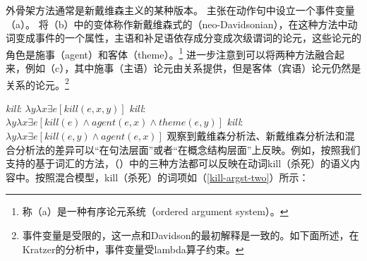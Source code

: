 外骨架方法通常是新戴维森主义的某种版本。 \citet{Davidson67a-u}主张在动作句中设立一个事件变量（a）。 \citet{Dowty89b-u}将（b）中的变体称作新戴维森式的（neo-Davidsonian），在这种方法中动词变成事件的一个属性，主语和补足语依存成分变成次级谓词的论元，这些论元的角色是施事（agent）和客体（theme）。\footnote{%
 \citet{Dowty89b-u}称（a）是一种有序论元系统（ordered argument system）。
}  \citet{Kratzer96a}进一步注意到可以将两种方法融合起来，例如（c），其中施事（主语）论元由关系提供，但是客体（宾语）论元仍然是关系的论元。\footnote{%
事件变量是受限的，这一点和Davidson的最初解释是一致的。如下面所述，在Kratzer的分析中，事件变量受lambda算子约束。} 

\eal\settowidth{} \label{neokill1}
\ex \emph{kill}: $\lambda y\lambda x\exists e[kill(e, x, y)]$  
\ex \emph{kill}: $\lambda y\lambda x\exists e[kill(e) \wedge agent(e, x) \wedge theme(e, y)]$ 
\ex \emph{kill}: $\lambda y\lambda x\exists e[kill(e,y) \wedge agent(e, x)]$ 
\zl
 \citet{Kratzer96a}观察到戴维森分析法、新戴维森分析法和混合分析法的差异可以“在句法层面”或者“在概念结构层面”上反映\citep[--111]{Kratzer96a}。例如，按照我们支持的基于词汇的方法，（）中的三种方法都可以反映在动词kill（杀死）的语义内容中。按照混合模型，kill（杀死）的词项如（\ref{kill-argst-two}）所示：

